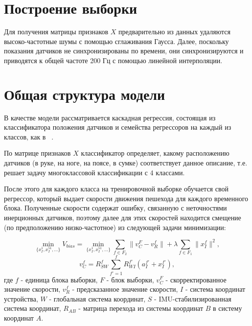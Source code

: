 \documentclass[12pt,twoside]{article}
\begin{document}

%

\section{Построение выборки}

Для получения матрицы признаков $X$ предварительно из данных удаляются высоко-частотные шумы с помощью сглаживания Гаусса. Далее, поскольку показания датчиков не синхронизированы по времени, они синхронизируются и приводятся к общей частоте 200 Гц с помощью линейной интерполяции.

\section{Общая структура модели}

В качестве модели рассматривается каскадная регрессия, состоящая из классификатора положения датчиков и семейства регрессоров на каждый из классов, как в ~\cite{journals/corr/abs-1712-09004}. 

По матрице признаков $X$ классификатор определяет, какому расположению датчиков (в руке, на ноге, на поясе, в сумке) соответствует данное описание, т.е. решает задачу многоклассовой классификации с 4 классами.

После этого для каждого класса на тренировочной выборке обучается свой регрессор, который выдает скорости движения пешехода для каждого временного блока. Полученные скорости содержат ошибку, связанную с неточностями инерционных датчиков, поэтому далее для этих скоростей находится смещение (по предположению низко-частотное) из следующей задачи минимизации:

\[\min_{\{x^1_I, x^51_I,\dots\}}V_{bias}=
\min_{\{x^1_I, x^51_I,\dots\}}\sum_{f \in F_2}\|v_C^F-v_R^f\|+
\lambda\sum_{f \in F_1}\|x^f_I\|^2,\]
\[v_C^f = R_{SW}^f\sum_{f'=1}^f R_{WI}^{f'}(a_I^{f'}+x_I^{f'}),\]
где $f$ - единица блока выборки, $F$ - блок выборки, $v_C^F$ - скорректированное значение скорости, $v_R^f$ - предсказанное значение скорости, $I$ - система координат устройства, $W$ - глобальная система координат, $S$ - IMU-стабилизированная система координат, $R_{AB}$ - матрица перехода из системы координат $B$ в систему координат $A$.
\end{document}
